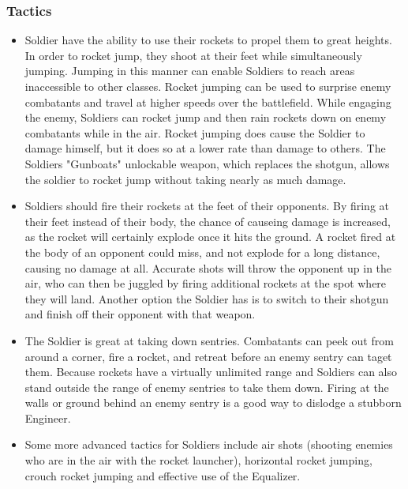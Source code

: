 \subsubsection {Tactics}
\begin {itemize} 

\item Soldier have the ability to use their rockets to propel them to great heights.  In order to rocket jump, they shoot at their feet while simultaneously jumping. Jumping in this manner can enable Soldiers to reach areas inaccessible to other classes. Rocket jumping can be used to surprise enemy combatants and travel at higher speeds over the battlefield. While engaging the enemy, Soldiers can rocket jump and then rain rockets down on enemy combatants while in the air. Rocket jumping does cause the Soldier to damage himself, but it does so at a lower rate than damage to others. The Soldiers "Gunboats" unlockable weapon, which replaces the shotgun, allows the soldier to rocket jump without taking nearly as much damage.

\item Soldiers should fire their rockets at the feet of their opponents.  By firing at their feet instead of their body, the chance of causeing damage is increased, as the rocket will certainly explode once it hits the ground.  A rocket fired at the body of an opponent could miss, and not explode for a long distance, causing no damage at all.  Accurate shots will throw the opponent up in the air, who can then be juggled by firing additional rockets at the spot where they will land.  Another option the Soldier has is to switch to their shotgun and finish off their opponent with that weapon.

\item The Soldier is great at taking down sentries. Combatants can peek out from around a corner, fire a rocket, and retreat before an enemy sentry can taget them. Because rockets have a virtually unlimited range and Soldiers can also stand outside the range of enemy sentries to take them down. Firing at the walls or ground behind an enemy sentry is a good way to dislodge a stubborn Engineer. 

\item Some more advanced tactics for Soldiers include air shots (shooting enemies who are in the air with the rocket launcher), horizontal rocket jumping, crouch rocket jumping and effective use of the Equalizer.

\end {itemize}
